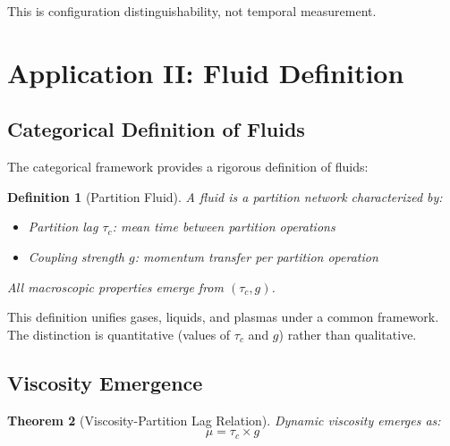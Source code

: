 \documentclass[aps,prl,twocolumn,superscriptaddress,floatfix]{revtex4-2}
\newtheorem{theorem}{Theorem}
\newtheorem{definition}[theorem]{Definition}
\begin{document}
This is configuration distinguishability, not temporal measurement.

\section{Application II: Fluid Definition}

\subsection{Categorical Definition of Fluids}

The categorical framework provides a rigorous definition of fluids:

\begin{definition}[Partition Fluid]
A fluid is a partition network characterized by:
\begin{itemize}
\item Partition lag $\tau_c$: mean time between partition operations
\item Coupling strength $g$: momentum transfer per partition operation
\end{itemize}
All macroscopic properties emerge from $(\tau_c, g)$.
\end{definition}

This definition unifies gases, liquids, and plasmas under a common framework. The distinction is quantitative (values of $\tau_c$ and $g$) rather than qualitative.

\subsection{Viscosity Emergence}

\begin{theorem}[Viscosity-Partition Lag Relation]
Dynamic viscosity emerges as:
\begin{equation}
\mu = \tau_c \times g
\end{equation}
\end{theorem}
\end{document}
